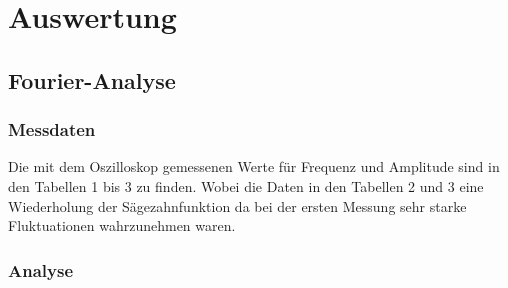 \section{Auswertung}
\label{sec:Auswertung}


\subsection{Fourier-Analyse}
\subsubsection{Messdaten}

Die mit dem Oszilloskop gemessenen Werte für Frequenz und Amplitude sind in den Tabellen 1 bis 3 zu finden.
Wobei die Daten in den Tabellen 2 und 3 eine Wiederholung der Sägezahnfunktion da bei der ersten Messung sehr starke Fluktuationen wahrzunehmen waren.



\subsubsection{Analyse}

